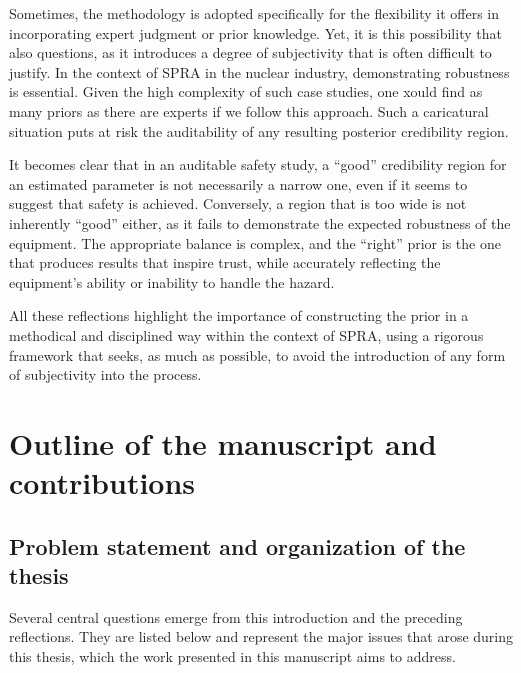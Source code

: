 Sometimes, the methodology is adopted specifically for the flexibility it offers in incorporating expert judgment or prior knowledge. Yet, it is this possibility that also questions, as it introduces a degree of subjectivity that is often difficult to justify. In the context of SPRA in the nuclear industry, demonstrating robustness is essential. Given the high complexity of such case studies, 
one xould find as many priors as there are experts if we follow this approach.
Such a caricatural situation puts at risk the auditability of any resulting posterior credibility region.

It becomes clear that in an auditable safety study, a ``good'' credibility region for an estimated parameter is not necessarily a narrow one, even if it seems to suggest that safety is achieved. Conversely, a region that is too wide is not inherently ``good'' either, as it fails to demonstrate the expected robustness of the equipment. The appropriate balance is complex, and the ``right'' prior is the one that produces results that inspire trust, while accurately reflecting the equipment’s ability or inability to handle the hazard.

All these reflections highlight the importance of constructing the prior in a methodical and disciplined way within the context of SPRA, using a rigorous framework that seeks, as much as possible, to avoid the introduction of any form of subjectivity into the process.





\section{Outline of the manuscript and contributions}

\subsection{Problem statement and organization of the thesis}



Several central questions emerge from this introduction and the preceding reflections. They are listed below and represent the major issues that arose during this thesis, which the work presented in this manuscript aims to address.\\





